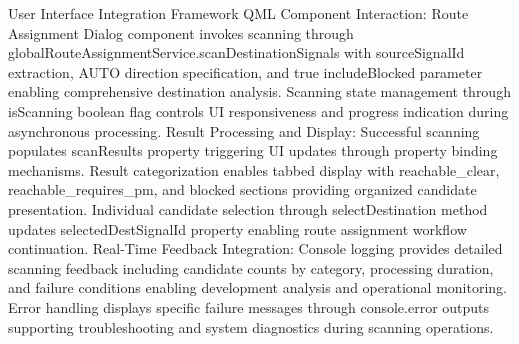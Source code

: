 User Interface Integration Framework
QML Component Interaction: Route Assignment Dialog component invokes scanning through globalRouteAssignmentService.scanDestinationSignals with sourceSignalId extraction, AUTO direction specification, and true includeBlocked parameter enabling comprehensive destination analysis. Scanning state management through isScanning boolean flag controls UI responsiveness and progress indication during asynchronous processing.
Result Processing and Display: Successful scanning populates scanResults property triggering UI updates through property binding mechanisms. Result categorization enables tabbed display with reachable_clear, reachable_requires_pm, and blocked sections providing organized candidate presentation. Individual candidate selection through selectDestination method updates selectedDestSignalId property enabling route assignment workflow continuation.
Real-Time Feedback Integration: Console logging provides detailed scanning feedback including candidate counts by category, processing duration, and failure conditions enabling development analysis and operational monitoring. Error handling displays specific failure messages through console.error outputs supporting troubleshooting and system diagnostics during scanning operations.